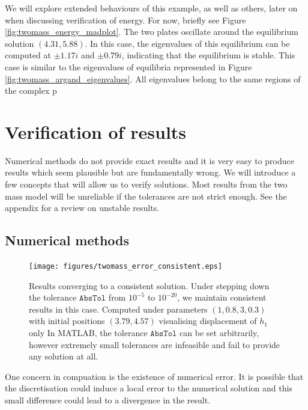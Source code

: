 We will explore extended behaviours of this example, as well as others, later on when discussing verification of energy. For now, briefly see Figure \ref{fig:twomass_energy_madplot}.
The two plates oscillate around the equilibrium solution \((4.31,5.88)\).
In this case, the eigenvalues of this equilibrium can be computed at $\pm 1.17i$ and $\pm 0.79i$,
indicating that the equilibrium is stable.
This case is similar to the eigenvalues of equilibria represented in Figure \ref{fig:twomass_argand_eigenvalues}. All eigenvalues belong to the same regions of the complex p

\section{Verification of results}

Numerical methods do not provide exact results and it is very easy to produce results which seem plausible but are fundamentally wrong.
We will introduce a few concepts that will allow us to verify solutions.
Most results from the two mass model will be unreliable if the tolerances are not strict enough.
See the appendix for a review on unstable results.

\subsection{Numerical methods}

\begin{figure}[h!]
    \centering
    \texttt{[image: figures/twomass\_error\_consistent.eps]}
    \caption{
        Results converging to a consistent solution.
        Under stepping down the tolerance \(\mathtt{AbsTol}\) from $10^{-5}$ to $10^{-20}$,
        we maintain consistent results in this case.
        Computed under parameters \((1, 0.8, 3, 0.3)\) with initial positions \((3.79, 4.57)\) visualising displacement of $h_1$ only
        In MATLAB, the tolerance $\mathtt{AbsTol}$ can be set arbitrarily,
        however extremely small tolerances are infeasible and fail to provide any solution at all.
    }
    \label{fig:twomass_stepping_convergence}
\end{figure}

One concern in compuation is the existence of numerical error.
It is possible that the discretisation could induce a local error to the numerical solution and this small difference could lead to a divergence in the result.

